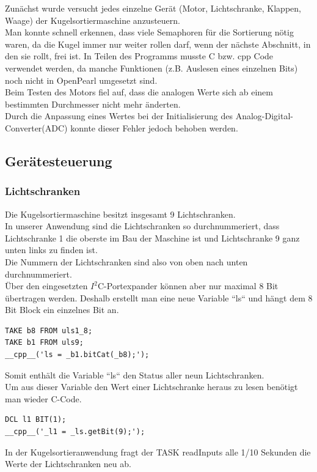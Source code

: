 \documentclass[12pt,a4paper]{article}
\begin{document}
\noindent
Zunächst wurde versucht jedes einzelne Gerät (Motor, Lichtschranke, Klappen, Waage) der Kugelsortiermaschine anzusteuern.\\
Man konnte schnell erkennen, dass viele Semaphoren für die Sortierung nötig waren, da die Kugel immer nur weiter rollen darf, wenn der nächste Abschnitt, in den sie rollt, frei ist.
In Teilen des Programms musste C bzw. cpp Code verwendet werden, da manche Funktionen (z.B. Auslesen eines einzelnen Bits) noch nicht in OpenPearl umgesetzt sind.\\
Beim Testen des Motors fiel auf, dass die analogen Werte sich ab einem bestimmten Durchmesser nicht mehr änderten.\\ 
Durch die Anpassung eines Wertes bei der Initialisierung des Analog-Digital-Converter(ADC) konnte dieser Fehler jedoch behoben werden.\\
\newpage

\subsection{Gerätesteuerung}
\subsubsection{Lichtschranken}
Die Kugelsortiermaschine besitzt insgesamt 9 Lichtschranken.\\
In unserer Anwendung sind die Lichtschranken so durchnummeriert, dass Lichtschranke 1 die oberste im Bau der Maschine ist und Lichtschranke 9 ganz unten links zu finden ist.\\
Die Nummern der Lichtschranken sind also von oben nach unten durchnummeriert.\\
Über den eingesetzten $I^2$C-Portexpander können aber nur maximal 8 Bit übertragen werden.
Deshalb erstellt man eine neue Variable “ls“ und hängt dem 8 Bit Block ein einzelnes Bit an.\\
\begin{lstlisting}
TAKE b8 FROM uls1_8;
TAKE b1 FROM uls9;
__cpp__('ls = _b1.bitCat(_b8);');
\end{lstlisting}
Somit enthält die Variable “ls“ den Status aller neun Lichtschranken.\\
Um aus dieser Variable den Wert einer Lichtschranke heraus zu lesen benötigt man wieder C-Code.\\
\begin{lstlisting}
DCL l1 BIT(1);
__cpp__('_l1 = _ls.getBit(9);');
\end{lstlisting}
In der Kugelsortieranwendung fragt der TASK readInputs alle 1/10 Sekunden die Werte der Lichtschranken neu ab.\\
\clearpage
\end{document}
